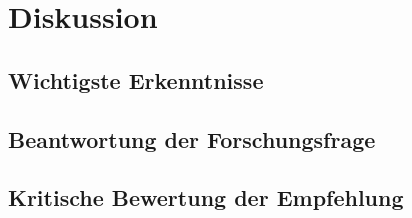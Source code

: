 \chapter{Diskussion}

\section{Wichtigste Erkenntnisse}

\section{Beantwortung der Forschungsfrage}

\section{Kritische Bewertung der Empfehlung}